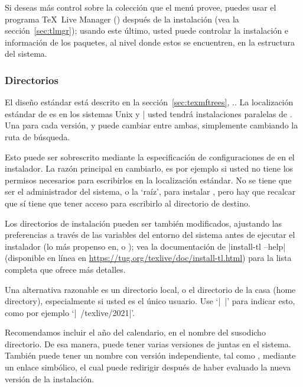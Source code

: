 \documentclass{article}
\begin{document}
Si deseas más control sobre la colección que el menú provee, puedes
usar el programa \TeX\ Live Manager () después de la
instalación (vea la sección~\ref{sec:tlmgr}); usando este último,
usted puede controlar la instalación e información de los paquetes, al
nivel donde estos se encuentren, en la estructura del sistema.

\subsubsection{Directorios}
\label{sec:directories}

El diseño estándar está descrito en la sección~\ref{sec:texmftrees},
\p.\pageref{sec:texmftrees}. La localización estándar de
 es  en los sistemas
Unix y |%
usted tendrá instalaciones paralelas de \TL. Una para cada versión, y puede
cambiar entre ambas, simplemente cambiando la ruta de búsqueda. 

Esto puede ser sobrescrito mediante la especificación de
configuraciones
de  en el instalador. La razón principal en cambiarlo,
es por ejemplo si usted no tiene los permisos necesarios para
escribirlos en la localización estándar. No se tiene que ser el
administrador del sistema, o la `raíz', para instalar \TL, pero hay que recalcar que sí
tiene que tener acceso para escribirlo al directorio de destino. 

Los directorios de instalación pueden ser también modificados, ajustando las preferencias a través de las variables del entorno del sistema antes de ejecutar el instalador (lo más propenso en, 
 o
); vea la documentación de 
|install-tl --help| (disponible en línea en
\url{https://tug.org/texlive/doc/install-tl.html}) para la lista completa que ofrece más detalles.

Una alternativa razonable es un directorio local, o el
directorio de la casa (home directory), especialmente si
usted es el único usuario. Use `|~|' para indicar esto, como
por ejemplo `|~/texlive/2021|'.

Recomendamos incluir el año del calendario, en el nombre del susodicho
directorio. De esa manera, puede tener varias versiones de \TL{}
juntas en el sistema. También puede tener un nombre con versión
independiente, tal como , mediante un
enlace simbólico, el cual puede redirigir después de haber evaluado la
nueva versión de la instalación.
\end{document}
